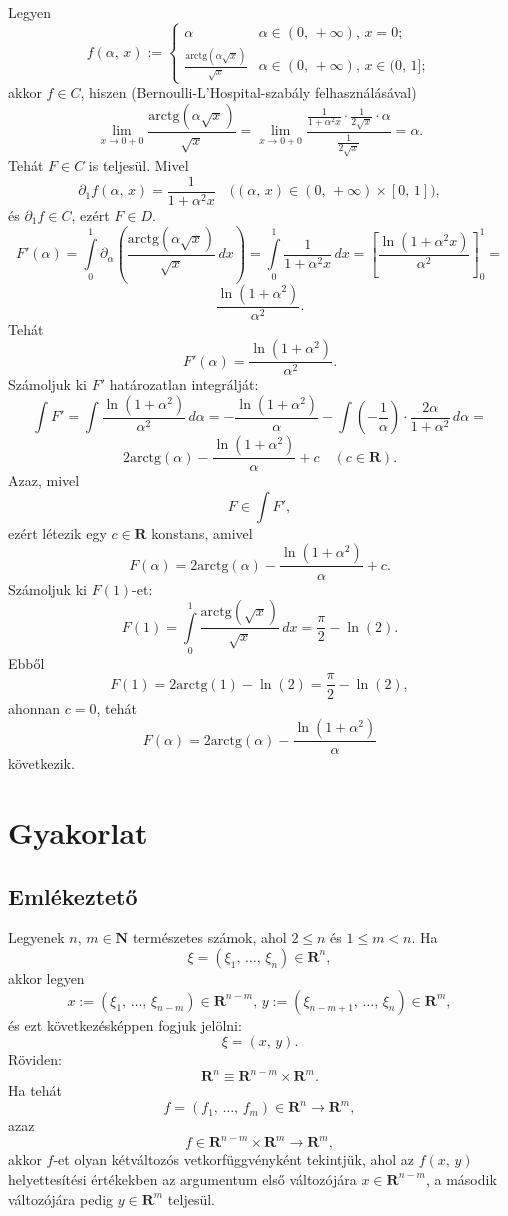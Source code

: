 \documentclass{article}
\newcommand{\R}{\mathbf{R}}
\newcommand{\N}{\mathbf{N}}
\begin{document}
	Legyen
	\[
		f(\alpha, \, x) := \begin{cases}
			\alpha & \alpha \in (0, \, + \infty), \, x = 0; \\
			\frac{\text{arctg}(\alpha \sqrt{x})}{\sqrt{x}} & \alpha \in (0, \, + \infty), \, x \in (0, \, 1];
		\end{cases}
	\]
	akkor $f \in C$, hiszen (Bernoulli-L'Hospital-szabály felhasználásával)
	\[
		\lim_{x \to 0 + 0} \frac{\text{arctg}(\alpha\sqrt{x})}{\sqrt{x}} = \lim_{x \to 0 + 0} \frac{\frac{1}{1 + \alpha^2 x} \cdot \frac{1}{2\sqrt{x}} \cdot \alpha}{\frac{1}{2\sqrt{x}}} = \alpha.
	\]
	Tehát $F \in C$ is teljesül. Mivel
	\[
		\partial_1 f(\alpha, \, x) = \frac{1}{1+ \alpha^2x} \quad \big( (\alpha, \, x) \in (0, \, + \infty) \times [0, \, 1] \big),
	\]
	és $\partial_1 f \in C$, ezért $F \in D$.
	\[
		F'(\alpha)= \int\limits_0^1 \partial_\alpha \left( \frac{\text{arctg}(\alpha \sqrt{x})}{\sqrt{x}} \, dx \right) = \int\limits_0^1 \frac{1}{1+\alpha^2 x} \, dx = \left[ \frac{\ln(1+\alpha^2x)}{\alpha^2} \right]_0^1 =
	\]
	\[
		\frac{\ln(1+\alpha^2)}{\alpha^2}.
	\]
	Tehát
	\[
		F'(\alpha) = \frac{\ln(1+\alpha^2)}{\alpha^2}.
	\]
	Számoljuk ki $F'$ határozatlan integrálját:
	\[
		\int F' = \int \frac{\ln(1+\alpha^2)}{\alpha^2} \, d\alpha = -\frac{\ln(1+\alpha^2)}{\alpha} - \int \left(-\frac{1}{\alpha}\right) \cdot \frac{2\alpha}{1 + \alpha^2} \, d\alpha =
	\]
	\[
		2 \text{arctg}(\alpha) - \frac{\ln(1+\alpha^2)}{\alpha} + c \quad (c \in \R).
	\]
	Azaz, mivel
	\[
		F \in \int F',
	\]
	ezért létezik egy $c \in \R$ konstans, amivel
	\[
		F(\alpha) = 2 \text{arctg}(\alpha) - \frac{\ln(1+\alpha^2)}{\alpha} + c.
	\]
	Számoljuk ki $F(1)$-et:
	\[
		F(1) = \int\limits_0^1 \frac{\text{arctg}(\sqrt{x})}{\sqrt{x}} \, dx = \frac{\pi}{2} - \ln(2).
	\]
	Ebből
	\[
		F(1) = 2 \text{arctg}(1) - \ln(2) = \frac{\pi}{2} - \ln(2),
	\]
	ahonnan $c=0$, tehát
	\[
		F(\alpha) = 2 \text{arctg}(\alpha) - \frac{\ln(1+\alpha^2)}{\alpha}
	\]
	következik.



	\newpage
	\section{Gyakorlat}
	\subsection{Emlékeztető}

	Legyenek $n, \, m \in \N$ természetes számok, ahol $2 \leq n$ és $1 \leq m < n$. Ha
	\[
		\xi = (\xi_1, \, \dots, \, \xi_n) \in \R^n,
	\]
	akkor legyen
	\[
		x := (\xi_1, \, \dots, \, \xi_{n-m}) \in \R^{n-m}, \, y := (\xi_{n-m+1}, \, \dots, \, \xi_n) \in \R^m,
	\]
	és ezt következésképpen fogjuk jelölni:
	\[
		\xi =(x, \, y).
	\]
	Röviden:
	\[
		\R^n \equiv \R^{n-m} \times \R^m.
	\]
	Ha tehát
	\[
		f = (f_1, \, \dots, \, f_m) \in \R^n \to \R^m,
	\]
	azaz
	\[
		f \in \R^{n-m} \times \R^m \to \R^m,
	\]
	akkor $f$-et olyan kétváltozós vetkorfüggvényként tekintjük, ahol az $f(x, \, y)$ helyettesítési értékekben az argumentum első változójára $x \in \R^{n-m}$, a második változójára pedig $y \in \R^m$ teljesül.\\
\end{document}
